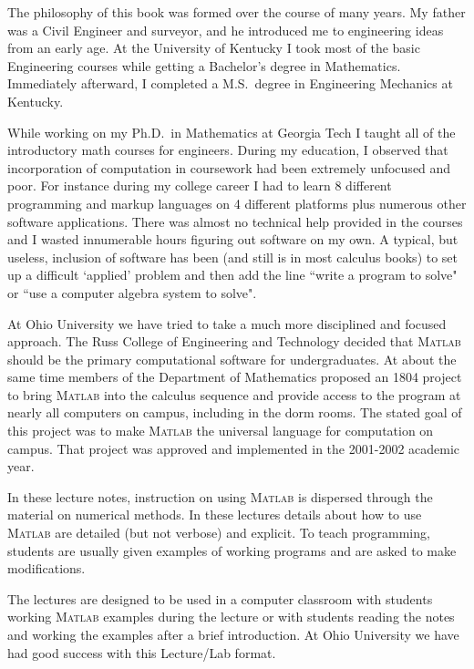\documentclass[11pt]{lectures}
\begin{document}
The philosophy of this book was formed over the course of many years.
My father was a Civil Engineer and surveyor, and he introduced me to engineering
ideas from an early age. At the University
of Kentucky I took most of the basic Engineering courses while
getting a Bachelor's degree in Mathematics. Immediately afterward,
I completed a M.S.~degree in Engineering Mechanics at Kentucky.

While working on my Ph.D.~in Mathematics at Georgia Tech I taught
all of the introductory math courses for engineers. During
my education, I observed that incorporation of computation
in coursework had been extremely unfocused and poor. For
instance during my college career I had to learn 8 different programming
and markup languages on 4 different platforms plus numerous other software
applications. There was almost no technical help provided in
the courses and I wasted innumerable hours figuring out software on
my own. A typical, but useless, inclusion of software has been (and
still is in most calculus books) to set up a difficult `applied'
problem and then add the line ``write a program to solve" or
``use a computer algebra system to solve".

At Ohio University we have
tried to take a much more disciplined and focused approach.
The Russ College of Engineering and Technology decided that \textsc{Matlab}
should be the primary computational software for undergraduates.
At about the same time members of the Department of Mathematics 
proposed an 1804 project to bring \textsc{Matlab} into the
calculus sequence and provide access to the program at nearly
all computers on campus, including in the dorm rooms. The
stated goal of this project was to make \textsc{Matlab} the
universal language for computation on campus. That project
was approved and implemented in the 2001-2002 academic year.


In these lecture notes, instruction on using \textsc{Matlab} is
dispersed through the material on numerical methods.
In these lectures details about how to use \textsc{Matlab} are
detailed (but not verbose) and explicit. To teach programming,
students are usually given examples of working programs and are
asked to make modifications.


The lectures are designed to be used in a computer classroom with
students working \textsc{Matlab} examples during the lecture or 
with students reading the notes and working the examples after a brief
introduction.
At Ohio University we have had good success with this Lecture/Lab
format. 
\end{document}
